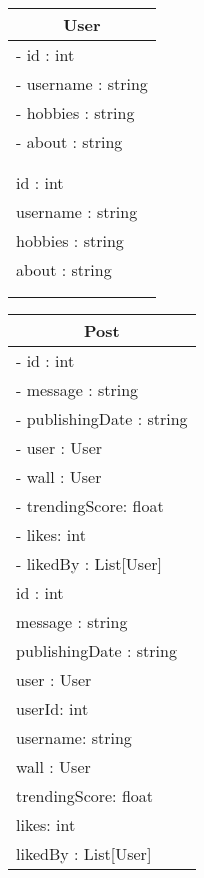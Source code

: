 \documentclass[parskip=half*]{scrartcl}
\begin{document}
\begin{figure}[htb]
    \centering
    \begin{tabular}[t]{|l|}
    \hline
    \multicolumn{1}{|c|}{\bfseries User} \\ \hline
     - id : int  \\
     - username : string  \\
     - hobbies : string  \\
     - about : string  \\  \\ \\ \hline
     id : int  \\
     username : string  \\
     hobbies : string  \\
     about : string  \\  \\ \\ \hline
    \end{tabular}
    \hspace{0.8cm}
    \begin{tabular}[t]{|l|}
    \hline
    \multicolumn{1}{|c|}{\bfseries Post} \\ \hline
     - id : int  \\
     - message : string \\
     - publishingDate : string  \\
     - user : User  \\
     - wall : User  \\
     - trendingScore: float \\
     - likes: int \\
     - likedBy : List[User]  \\ \hline
     id : int  \\
     message : string  \\
     publishingDate : string  \\
     user : User  \\
     userId: int \\
     username: string \\
     wall : User  \\
     trendingScore: float \\
     likes: int \\
     likedBy : List[User] \\ \hline
    \end{tabular}
    \label{fig:klasse_User_Post}
\end{figure}
\end{document}

